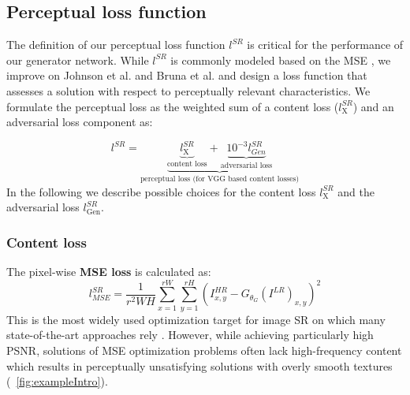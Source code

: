 \documentclass[10pt,twocolumn,letterpaper]{article}
\begin{document}
\subsection{Perceptual loss function}
\label{sec:losses}
The definition of our perceptual loss function $l^{SR}$  is critical for the performance of our generator network.
While $l^{SR}$ is commonly modeled based on the \ac{MSE}  \cite{dong2016image,Shi2016ESPCN}, we improve on Johnson et al. \cite{Johnson16PercepLoss} and Bruna et al. \cite{bruna2016super} and design a loss function that assesses a solution with respect to perceptually relevant characteristics.
We formulate the perceptual loss as the weighted sum of a content loss ($l^{SR}_\textrm{X}$) and an adversarial loss component as:

\begin{equation}
	l^{SR} = \underbrace{\underbrace{l^{SR}_\textrm{X}}_{\text{content loss}} + \underbrace{10^{-3} l^{SR}_{Gen}}_{\text{adversarial loss}}}_{\text{perceptual loss (for VGG based content losses)}}
\end{equation}
In the following we describe possible choices for the content loss $l^{SR}_\textrm{X}$ and the adversarial loss $l^{SR}_\textrm{Gen}$.

\subsubsection{Content loss}

The pixel-wise \textbf{\ac{MSE} loss} is calculated as:
\begin{equation}
	l^{SR}_{MSE} = \frac{1}{r^2WH} \sum_{x=1}^{rW} \sum_{y=1}^{rH} (I^{HR}_{x,y} - G_{\theta_G}(I^{LR})_{x,y})^2
\end{equation}
This is the most widely used optimization target for image \ac{SR} on which many state-of-the-art approaches rely \cite{dong2016image,Shi2016ESPCN}. However, while achieving particularly high \ac{PSNR}, solutions of \ac{MSE} optimization problems often lack high-frequency content which results in perceptually unsatisfying solutions with overly smooth textures (\cf \figurename~\ref{fig:exampleIntro}).
\end{document}
